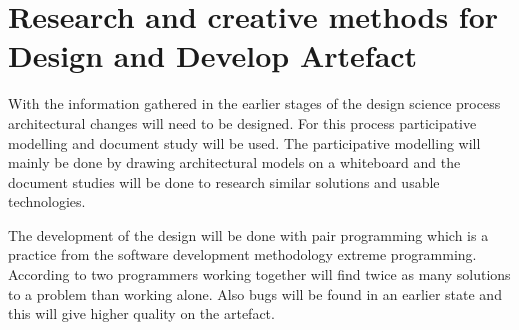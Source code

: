 \section{Research and creative methods for Design and Develop Artefact}
With the information gathered in the earlier stages of the design science process architectural changes will need to be designed. For this process participative modelling \cite{johannesson2012design} and document study will be used. The participative modelling will mainly be done by drawing architectural models on a whiteboard and the document studies will be done to research similar solutions and usable technologies. 

The development of the design will be done with pair programming \cite{williams2000all} which is a practice from the software development methodology extreme programming. According to \cite{williams2000all} two programmers working together will find twice as many solutions to a problem than working alone. Also bugs will be found in an earlier state and this will give higher quality on the artefact. 